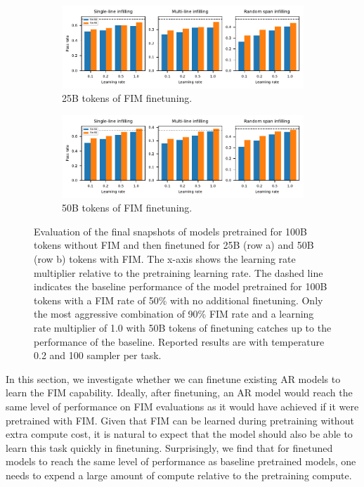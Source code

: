 \documentclass[postscript]{article}
\begin{document}
\begin{figure}[ht!]
\centering
    \begin{subfigure}[b]{\textwidth}
        \centering
        \includegraphics[width=\textwidth]{figures/finetuning_bar_25b.pdf}
        \caption{25B tokens of FIM finetuning.}
    \end{subfigure}
    \begin{subfigure}[b]{\textwidth}
        \centering
        \includegraphics[width=\textwidth]{figures/finetuning_bar_50b.pdf}
        \caption{50B tokens of FIM finetuning.}
    \end{subfigure}
\caption{Evaluation of the final snapshots of models pretrained for 100B tokens without FIM and then finetuned for 25B (row a) and 50B (row b) tokens with FIM. The x-axis shows the learning rate multiplier relative to the pretraining learning rate. The dashed line indicates the baseline performance of the model pretrained for 100B tokens with a FIM rate of 50\% with no additional finetuning. Only the most aggressive combination of 90\% FIM rate and a learning rate multiplier of 1.0 with 50B tokens of finetuning catches up to the performance of the baseline. Reported results are with temperature 0.2 and 100 sampler per task.} \label{fig:finetuning_main_fig}
\end{figure}
In this section, we investigate whether we can finetune existing AR models to learn the FIM capability. Ideally, after finetuning, an AR model would reach the same level of performance on FIM evaluations as it would have achieved if it were pretrained with FIM. Given that FIM can be learned during pretraining without extra compute cost, it is natural to expect that the model should also be able to learn this task quickly in finetuning. Surprisingly, we find that for finetuned models to reach the same level of performance as baseline pretrained models, one needs to expend a large amount of compute relative to the pretraining compute.
\end{document}
